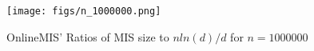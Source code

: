 \begin{figure}
    \centering
    \texttt{[image: figs/n\_1000000.png]}
    \caption{OnlineMIS' Ratios of MIS size to $nln(d)/d$ for $n =1000000$}
    \label{fig:n_1000000}
\end{figure}
